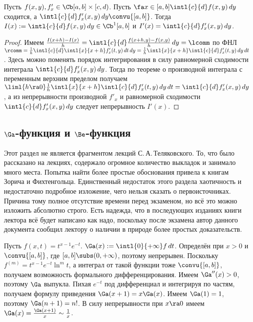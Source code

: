\documentclass[a4paper]{article}
\newcommand{\intloi}{\intl{0}{+\infty}}
\begin{document}
\begin{theorem}
Пусть $f(x,y), f'_x \in\Cb[a,b]\times[c,d)$. Пусть $\fa x \in [a,b] \intl{c}{d}f(x,y)\,d y$
сходится, а $\intl{c}{d}f'_x(x,y)\,d y\convu{[a,b]}$. Тогда $I(x) := \intl{c}{d}f(x,y)\,d y
\in\Cb^1[a,b]$ и $I'(x)=\intl{c}{d}f'_x(x,y)\,d y$.
\end{theorem}
\begin{proof}
Имеем $\frac{I(x+h)-I(x)}{h}=\intl{c}{d}\frac{f(x+h,y)-f(x,y)}{h}\,d y = \lcomm$ по ФНЛ $\rcomm =
\frac{1}{h}\intl{c}{d}\intl{x}{x+h}f'_x(t,y)\,d t\,d y =
\frac{1}{h}\intl{x}{x+h}\intl{c}{d}f'_x(t,y)\,d y\,d t$. Здесь можно поменять порядок
интегрирования в силу равномерной сходимости интеграла $\intl{c}{d}f'_x(x,y)\,d y$. Тогда по
теореме о производной интеграла с переменным верхним пределом получаем
$\liml{h\ra0}\frac{1}{h}\intl{x}{x+h}\intl{c}{d}f'_x(t,y)\,d y\,d t = \intl{c}{d}f'_x(x,y)\,d
y$, а из непрерывности производной $f'_x$ и равномерной сходимости $\intl{c}{d}f'_x(x,y)\,d y$
следует непрерывность $I'(x)$.
\end{proof}

\subsection{$\Ga$-функция и $\Be$-функция}
\begin{note}
Этот раздел не является фрагментом лекций С.\,А.\,Теляковского. То, что было рассказано на лекциях,
содержало огромное количество выкладок и занимало много места. Попытка найти более простые обоснования
привела к книгам Зорича и Фихтенгольца. Единственный недостаток этого раздела хаотичность и недостаточно
подробное изложение, чего нельзя сказать о первоисточниках. Причина тому полное отсутствие времени
перед экзаменом, но всё это можно изложить абсолютно строго. Есть надежда,
что в последующих изданиях книги лектора всё будет написано как надо, поскольку после экзамена
автор данного документа сообщил лектору о наличии в природе более простых доказательств.
\end{note}

Пусть $f(x,t)=t^{x-1}e^{-t}$. $\Ga(x) := \intloi f \,d t$. Определён при $x>0$ и $\convu{[a,b]}$,
где $[a,b] \subs (0,+\infty)$, поэтому непрерывен. Поскольку $f^{(m)} = t^{x-1}e^{-t}\ln^m t$, а
интеграл от такой функции тоже $\convu{[a,b]}$, получаем возможность формального дифференцирования.
Имеем $\Ga''(x) > 0$, поэтому $\Ga$ выпукла. Пихая $e^{-t}$ под дифференциал и интегрируя по
частям, получаем формулу приведения $\Ga(x+1)=x\Ga(x)$. Имеем $\Ga(1)=1$, поэтому $\Ga(n+1) = n!$.
В силу непрерывности при $x\ra 0$ имеем $\Ga(x)=\frac{\Ga(x+1)}{x}\sim \frac{1}{x}$.
\end{document}
